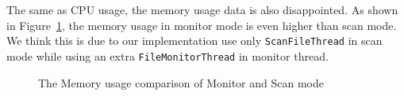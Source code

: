 The same as CPU usage, the memory usage data is also disappointed. As shown in Figure~\ref{fig:memory}, the memory usage in 
monitor mode is even higher than scan mode. We think this is due to our implementation use only \verb+ScanFileThread+ in 
scan mode while using an extra \verb+FileMonitorThread+ in monitor thread. 

\begin{figure}%
\centering
{}
\hspace{0.20in}
\caption{The Memory usage comparison of Monitor and Scan mode}
\label{fig:memory}
\end{figure}

